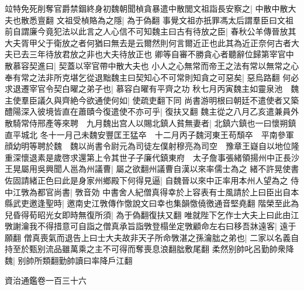 竝特免死削奪官爵禁錮終身初魏朝聞楨貪暴遣中散閭文祖詣長安察之|{
	中散中散大夫也散悉亶翻}
文祖受楨賂為之隱|{
	為于偽翻}
事覺文祖亦扺罪馮太后謂羣臣曰文祖前自謂廉今竟犯法以此言之人心信不可知魏主曰古有待放之臣|{
	春秋公羊傳晉放其大夫胥甲父于衛放之者何猶曰無去是云爾然則何言爾近正也此其為近正奈何古者大夫已去三年待放君放之非也大夫待放正也}
卿等自審不勝貪心者聽辭位歸第宰官中散慕容契進曰|{
	契蓋以宰官帶中散大夫也}
小人之心無常而帝王之法有常以無常之心奉有常之法非所克堪乞從退黜魏主曰契知心不可常則知貪之可惡矣|{
	惡烏路翻}
何必求退遷宰官令契白曜之弟子也|{
	慕容白曜有平齊之功}
秋七月丙寅魏主如靈泉池　魏主使羣臣議久與齊絶今欲通使何如|{
	使疏吏翻下同}
尚書游明根曰朝廷不遣使者又築醴陽深入彼境皆直在蕭賾今復遣使不亦可乎|{
	復扶又翻}
魏主從之八月乙亥遣兼員外散騎常侍邢產等來聘　九月魏出宫人以賜北鎮人貧無妻者|{
	北鎮六鎮也一曰懷朔鎮直平城北}
冬十一月己未魏安豐匡王猛卒　十二月丙子魏河東王苟頹卒　平南參軍顔幼明等聘於魏　魏以尚書令尉元為司徒左僕射穆亮為司空　豫章王嶷自以地位隆重深懷退素是歲啓求還第上令其世子子廉代鎮東府　太子詹事張緒領揚州中正長沙王晃屬用吳興聞人邕為州議曹|{
	屬之欲翻州議曹自漢以來率儒士為之}
緒不許晃使書佐固請緒正色曰此是身家州鄉殿下何得見逼|{
	自魏晉以來中正率用本州人望為之}
侍中江斆為都官尚書|{
	斆音効}
中書舍人紀僧真得幸於上容表有士風請於上曰臣出自本縣武吏邀逢聖時|{
	邀南史江斆傳作憿說文曰幸也集韻憿僥徼通音堅堯翻}
階榮至此為兒昏得荀昭光女即時無復所須|{
	為于偽翻復扶又翻}
唯就陛下乞作士大夫上曰此由江斆謝瀹我不得措意可自詣之僧真承旨詣斆登榻坐定斆顧命左右曰移吾牀遠客|{
	遠于願翻}
僧真喪氣而退告上曰士大夫故非天子所命斆湛之孫瀹朏之弟也|{
	二家以名義自持至於甄别流品雖萬乘之主不可得而奪喪息浪翻朏敷尾翻}
柔然别帥叱呂勤帥衆降魏|{
	别帥所類翻勤帥讀曰率降戶江翻}


資治通鑑卷一百三十六
